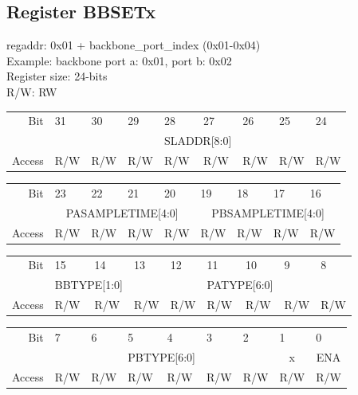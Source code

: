 \documentclass{article}
\begin{document}
\subsection{Register BBSETx}
regaddr: 0x01 + backbone\_port\_index (0x01-0x04)\\
Example: backbone port a: 0x01, port b: 0x02\\
Register size: 24-bits\\
R/W: RW\\
\begin{table}[h!]
    \centering
\begin{tabular}{rp{1cm}p{1cm}p{1cm}p{1cm}p{1cm}p{1cm}p{1cm}p{1cm}}
Bit &
  31 &
  30 &
  29 &
  28 &
  27 &
  26 &
  25 &
  24 \\ \cline{2-9} 
\multicolumn{1}{r|}{} &
  \multicolumn{2}{c}{} &
   \multicolumn{1}{c}{} &
  \multicolumn{2}{l}{\scriptsize{SLADDR[8:0]}} &
  \multicolumn{1}{c}{} &
  \multicolumn{1}{c}{} &
  \multicolumn{1}{c|}{} \\\cline{2-9} 
Access &
  R/W &
  R/W &
  R/W &
  R/W &
  R/W &
  R/W &
  R/W &
  R/W
\end{tabular}
\begin{tabular}{rp{1cm}p{1cm}p{1cm}p{1cm}p{1cm}p{1cm}p{1cm}p{1cm}}
Bit &
  23 &
  22 &
  21 &
  20 &
  19 &
  18 &
  17 &
  16 \\ \cline{2-9} 
\multicolumn{1}{r|}{} &
\multicolumn{4}{c|}{\scriptsize{PASAMPLETIME[4:0]}} & 
\multicolumn{4}{c|}{\scriptsize{PBSAMPLETIME[4:0]}} \\\cline{2-9} 
Access &
  R/W &
  R/W &
  R/W &
  R/W &
  R/W &
  R/W &
  R/W &
  R/W
\end{tabular}
\begin{tabular}{rp{1cm}p{1cm}p{1cm}p{1cm}p{1cm}p{1cm}p{1cm}p{1cm}}
Bit &
  15 &
  14 &
  13 &
  12 &
  11 &
  10 &
  9 &
  8 \\ \cline{2-9} 
  
\multicolumn{1}{r|}{} &
  \multicolumn{2}{c|}{{\scriptsize{BBTYPE[1:0]}}} &
  \multicolumn{2}{c}{} &
  \multicolumn{2}{c}{{\scriptsize{PATYPE[6:0]}}} &
  \multicolumn{1}{c}{} &
  \multicolumn{1}{c|}{} \\\cline{2-9} 
Access &
  R/W &
  R/W &
  R/W &
  R/W &
  R/W &
  R/W &
  R/W &
  R/W
\end{tabular}
\begin{tabular}{rp{1cm}p{1cm}p{1cm}p{1cm}p{1cm}p{1cm}p{1cm}p{1cm}}
Bit &
  7 &
  6 &
  5 &
  4 &
  3 &
  2 &
  1 &
  0 \\ \cline{2-9} 

  \multicolumn{1}{r|}{} &
  \multicolumn{2}{c}{} &
  \multicolumn{2}{c}{\scriptsize{PBTYPE[6:0]}} &
  \multicolumn{2}{c|}{} &
  \multicolumn{1}{c|}{x} &
  \multicolumn{1}{c|}{\scriptsize{ENA}} \\\cline{2-9} 
  
Access &
  R/W &
  R/W &
  R/W &
  R/W &
  R/W &
  R/W &
  R/W &
  R/W
\end{tabular}
\end{table}\\
\end{document}
